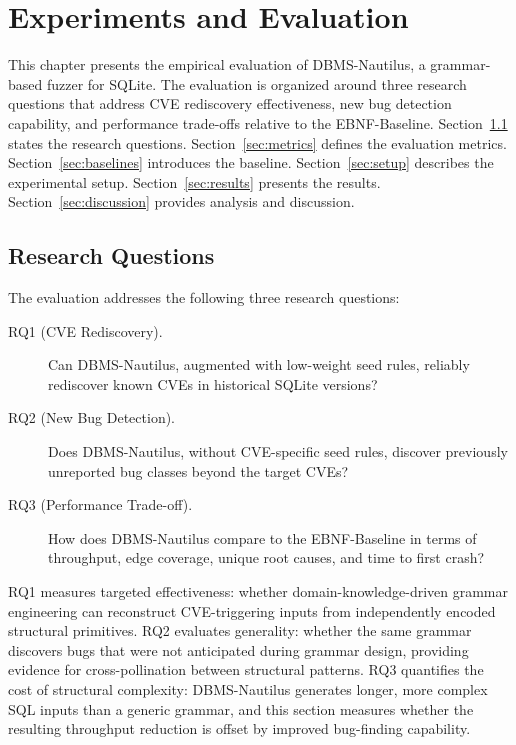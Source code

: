 \chapter{Experiments and Evaluation}
\label{chap:experiments}

This chapter presents the empirical evaluation of DBMS-Nautilus, a grammar-based fuzzer for SQLite. The evaluation is organized around three research questions that address CVE rediscovery effectiveness, new bug detection capability, and performance trade-offs relative to the EBNF-Baseline. Section~\ref{sec:rqs} states the research questions. Section~\ref{sec:metrics} defines the evaluation metrics. Section~\ref{sec:baselines} introduces the baseline. Section~\ref{sec:setup} describes the experimental setup. Section~\ref{sec:results} presents the results. Section~\ref{sec:discussion} provides analysis and discussion.


\section{Research Questions}
\label{sec:rqs}

The evaluation addresses the following three research questions:

\begin{description}
  \item[RQ1 (CVE Rediscovery).] Can DBMS-Nautilus, augmented with low-weight seed rules, reliably rediscover known CVEs in historical SQLite versions?
  \item[RQ2 (New Bug Detection).] Does DBMS-Nautilus, without CVE-specific seed rules, discover previously unreported bug classes beyond the target CVEs?
  \item[RQ3 (Performance Trade-off).] How does DBMS-Nautilus compare to the EBNF-Baseline in terms of throughput, edge coverage, unique root causes, and time to first crash?
\end{description}

RQ1 measures targeted effectiveness: whether domain-knowledge-driven grammar engineering can reconstruct CVE-triggering inputs from independently encoded structural primitives. RQ2 evaluates generality: whether the same grammar discovers bugs that were not anticipated during grammar design, providing evidence for cross-pollination between structural patterns. RQ3 quantifies the cost of structural complexity: DBMS-Nautilus generates longer, more complex SQL inputs than a generic grammar, and this section measures whether the resulting throughput reduction is offset by improved bug-finding capability.





